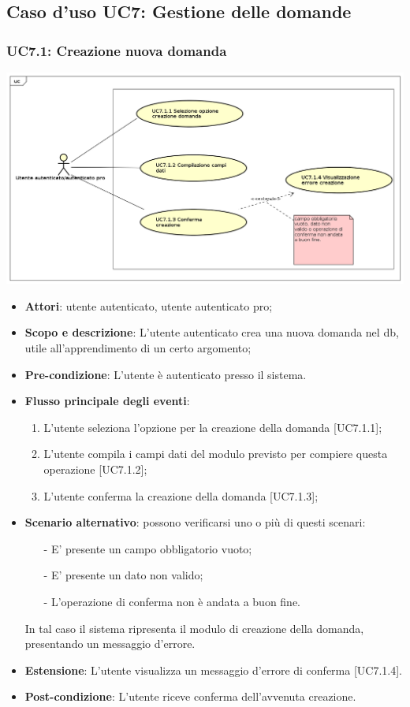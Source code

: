 \subsection{Caso d'uso UC7: Gestione delle domande}
	
\subsubsection{UC7.1: Creazione nuova domanda}
	\begin{center}
		\includegraphics[scale=0.7,keepaspectratio]{UML/UC7.1.png}
	\end{center}
	\begin{itemize}
		\item
			\textbf{Attori}: utente autenticato, utente autenticato pro;
		\item		
			\textbf{Scopo e descrizione}: L'utente autenticato crea una nuova domanda nel db, utile all'apprendimento di un certo argomento;
		\item
			\textbf{Pre-condizione}: L'utente è autenticato presso il sistema. 
		\item
			\textbf{Flusso principale degli eventi}:
	       		\begin{enumerate}
					\item 	
					L'utente seleziona l'opzione per la creazione della domanda [UC7.1.1];
					\item
					L'utente compila i campi dati del modulo previsto per compiere questa operazione [UC7.1.2];
					\item
					L'utente conferma la creazione della domanda [UC7.1.3];
	 			\end{enumerate}
	 	\item
	 		\textbf{Scenario alternativo}: possono verificarsi uno o più di questi scenari:
				\begin{itemize}
					\item[-] 	
						E' presente un campo obbligatorio vuoto;
					\item[-] 
    						E' presente  un dato non valido;
					\item[-] 
						L'operazione di conferma non è andata a buon fine.
				\end{itemize}
			In tal caso il sistema ripresenta il modulo di creazione della domanda, presentando un messaggio d'errore.
		\item
			\textbf{Estensione}: L'utente visualizza un messaggio d'errore di conferma [UC7.1.4].
		\item
			\textbf{	Post-condizione}: L'utente riceve conferma dell'avvenuta creazione.
	\end{itemize}
